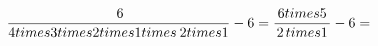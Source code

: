\documentclass[preview]{standalone}
\begin{document}
\begin{center}
\[ \frac{ \: 6  }{ 4 \\times 3 \\times 2 \\times 1 \: \\times \: 2 \\times 1} - 6 = \frac{ \:6 \\times 5 \: }{2 \\times 1 } - 6 = \]
\end{center}
\end{document}
